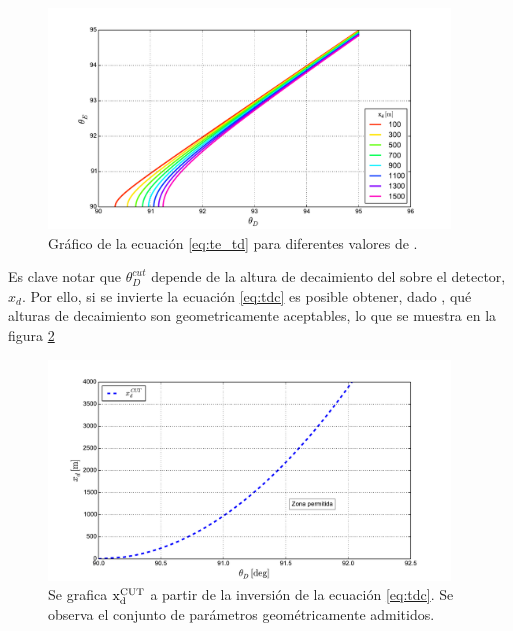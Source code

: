 	\begin{figure}[ht!]
		\centering
		\includegraphics[width=0.95\textwidth]{./fig/appendix/thE_thD}
		\caption{\label{fig:te_td}
		Gr\'afico de la ecuaci\'on \ref{eq:te_td} para diferentes valores de \xd{}.
		}
	\end{figure}
	
	Es clave notar que $\theta_D^{cut}$ depende de la altura de decaimiento del \tauon{} sobre el detector, $x_d$.
	Por ello, si se invierte la ecuaci\'on \ref{eq:tdc} es posible obtener, dado \td{}, qu\'e alturas de decaimiento \xd{} son geometricamente aceptables, lo que se muestra en la figura \ref{fig:dx_thcut}
	
	\begin{figure}[ht!]
		\centering
		\includegraphics[width=0.95\textwidth]{./fig/appendix/thetaDCut}
		\caption{\label{fig:dx_thcut}
		Se grafica $\rm x_d^{CUT}$ a partir de la inversi\'on de la ecuaci\'on \ref{eq:tdc}. Se observa el conjunto de par\'ametros geom\'etricamente admitidos.
		}
	\end{figure}

